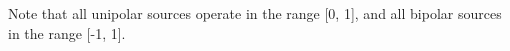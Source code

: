 Note that all unipolar sources operate in the range [0, 1], and all bipolar sources in the range [-1, 1].

\newcommand{\modsource}[4]{
    \fat{#1} &
    \IfEqCase{#2}{%
        {M}{Mono}%
            {P}{Poly}%
    }[\PackageError{audioparameter}{Undefined option to param: #2}{}]  &
    \IfEqCase{#3}{%
        {U}{Unipolar}%
            {B}{Bipolar}%
    }[\PackageError{audioparameter}{Undefined option to param: #3}{}] &
    #4 \\
    \hline
}

\vspace{5mm}
{\renewcommand{\arraystretch}{1.4}
    \begin{longtable}{| L{0.2\textwidth} | L{0.1\textwidth} | L{0.12\textwidth} |L{0.5\textwidth} |}
        \hline

             &
         &
           &
          \\
        \hline


\end{longtable}}

